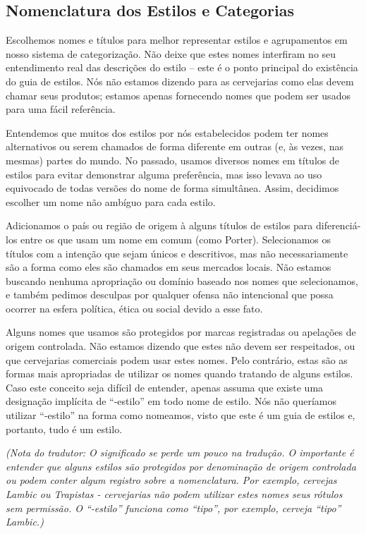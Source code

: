 \subsection*{Nomenclatura dos Estilos e Categorias}

Escolhemos nomes e títulos para melhor representar estilos e agrupamentos em nosso sistema de categorização. Não deixe que estes nomes interfiram no seu entendimento real das descrições do estilo – este é o ponto principal do existência do guia de estilos. Nós não estamos dizendo para as cervejarias como elas devem chamar seus produtos; estamos apenas fornecendo nomes que podem ser usados para uma fácil referência.

Entendemos que muitos dos estilos por nós estabelecidos podem ter nomes alternativos ou serem chamados de forma diferente em outras (e, às vezes, nas mesmas) partes do mundo. No passado, usamos diversos nomes em títulos de estilos para evitar demonstrar alguma preferência, mas isso levava ao uso equivocado de todas versões do nome de forma simultânea. Assim, decidimos escolher um nome não ambíguo para cada estilo.

Adicionamos o país ou região de origem à alguns títulos de estilos para diferenciá-los entre os que usam um nome em comum (como Porter). Selecionamos os títulos com a intenção que sejam únicos e descritivos, mas não necessariamente são a forma como eles são chamados em seus mercados locais. Não estamos buscando nenhuma apropriação ou domínio baseado nos nomes que selecionamos, e também pedimos desculpas por qualquer ofensa não intencional que possa ocorrer na esfera política, ética ou social devido a esse fato.

Alguns nomes que usamos são protegidos por marcas registradas ou apelações de origem controlada. Não estamos dizendo que estes não devem ser respeitados, ou que cervejarias comerciais podem usar estes nomes. Pelo contrário, estas são as formas mais apropriadas de utilizar os nomes quando tratando de alguns estilos. Caso este conceito seja difícil de entender, apenas assuma que existe uma designação implícita de “-estilo” em todo nome de estilo. Nós não queríamos utilizar “-estilo” na forma como nomeamos, visto que este é um guia de estilos e, portanto, tudo é um estilo.

\textit{(Nota do tradutor: O significado se perde um pouco na tradução. O importante é entender que alguns estilos são protegidos por denominação de origem controlada ou podem conter algum registro sobre a nomenclatura. Por exemplo, cervejas Lambic ou Trapistas - cervejarias não podem utilizar estes nomes seus rótulos sem permissão. O “-estilo” funciona como “tipo”, por exemplo, cerveja “tipo” Lambic.)}
